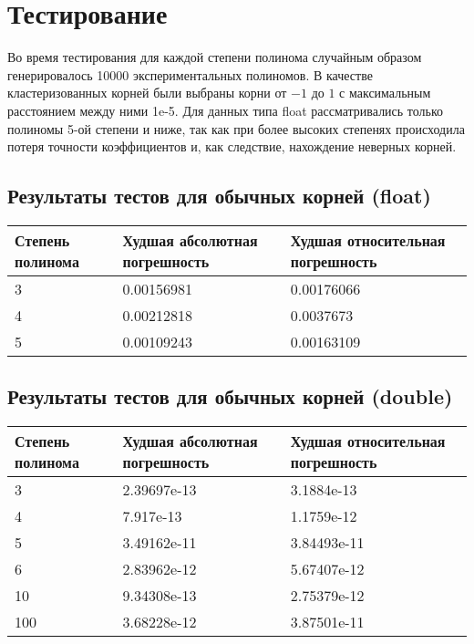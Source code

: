 \documentclass[a4paper,12pt]{article}
\begin{document}
\section{Тестирование}
Во время тестирования для каждой степени полинома случайным образом генерировалось 10000 экспериментальных полиномов. В качестве кластеризованных корней были выбраны корни от $-1$ до $1$ с максимальным расстоянием между ними 1e-5. Для данных типа float рассматривались только полиномы 5-ой степени и ниже, так как при более высоких степенях происходила потеря точности коэффициентов и, как следствие, нахождение неверных корней.

\subsection{Результаты тестов для обычных корней (float)}
\begin{center}
  \begin{tabular}{|p{4.5cm}|p{5.5cm}|p{5.5cm}|}
  \hline
  \textbf{Степень полинома}  &  \textbf{Худшая абсолютная погрешность} & \textbf{Худшая относительная погрешность} \\
  \hline
  3 & 0.00156981 & 0.00176066 \\
  \hline
  4 & 0.00212818 & 0.0037673 \\
  \hline
  5 & 0.00109243 & 0.00163109 \\
  \hline
\end{tabular}
\label{tab:my_label_2}
\end{center}

\subsection{Результаты тестов для обычных корней (double)}
\begin{center}
  \begin{tabular}{|p{4.5cm}|p{5.5cm}|p{5.5cm}|}
  \hline
  \textbf{Степень полинома}  &  \textbf{Худшая абсолютная погрешность} & \textbf{Худшая относительная погрешность} \\
  \hline
  3 & 2.39697e-13 & 3.1884e-13 \\
  \hline
  4 & 7.917e-13 & 1.1759e-12 \\
  \hline
  5 & 3.49162e-11 & 3.84493e-11 \\
  \hline
  6 & 2.83962e-12 & 5.67407e-12 \\
  \hline
  10 & 9.34308e-13 & 2.75379e-12 \\
  \hline
  100 & 3.68228e-12 & 3.87501e-11 \\
  \hline
\end{tabular}
\label{tab:my_label_2}
\end{center}
\end{document}
